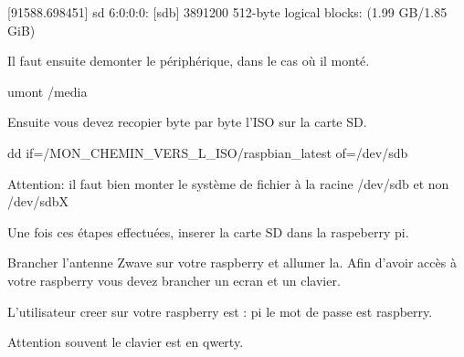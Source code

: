 [91588.698451] sd 6:0:0:0: [sdb] 3891200 512-byte logical blocks: (1.99 GB/1.85 GiB)

Il faut ensuite demonter le périphérique, dans le cas où il monté.

umont /media

Ensuite vous devez recopier byte par byte l'ISO sur la carte SD.

dd if=/MON_CHEMIN_VERS_L_ISO/raspbian_latest of=/dev/sdb

Attention: il faut bien monter le système de fichier à la racine /dev/sdb et non /dev/sdbX 

Une fois ces étapes effectuées, inserer la carte SD dans la raspeberry pi.

Brancher l'antenne Zwave sur votre raspberry et allumer la.
Afin d'avoir accès à votre raspberry vous devez brancher un ecran et un clavier. 

L'utilisateur creer sur votre raspberry est : pi
le mot de passe est raspberry. 

Attention souvent le clavier est en qwerty.




